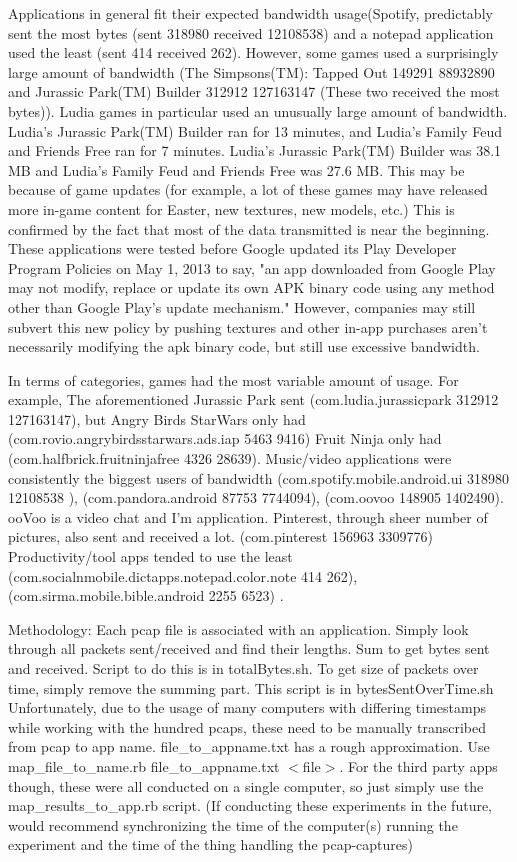 Applications in general fit their expected bandwidth usage(Spotify, predictably sent the most bytes (sent 318980 received 12108538) and a notepad application used the least (sent 414 received 262). However, some games used a surprisingly large amount of bandwidth (The Simpsons(TM): Tapped Out 149291 88932890 and Jurassic Park(TM) Builder
 312912 127163147 (These two received the most bytes)). Ludia games in particular used an unusually large amount of bandwidth. Ludia's Jurassic Park(TM) Builder ran for 13 minutes, and Ludia's Family Feud and Friends Free ran for 7 minutes. Ludia's Jurassic Park(TM) Builder was 38.1 MB  and Ludia's Family Feud and Friends Free was 27.6 MB. This may be because of game updates (for example, a lot of these games may have released more in-game content for Easter, new textures, new models, etc.) This is confirmed by the fact that most of the data transmitted is near the beginning. These applications were tested before Google updated its Play Developer Program Policies on May 1, 2013 to say, "an app downloaded from Google Play may not modify, replace or update its own APK binary code using any method other than Google Play's update mechanism." However, companies may still subvert this new policy by pushing textures and other in-app purchases aren't necessarily modifying the apk binary code, but still use excessive bandwidth. 
 
In terms of categories, games had the most variable amount of usage. For example, The aforementioned Jurassic Park sent  (com.ludia.jurassicpark 312912 127163147), but Angry Birds StarWars only had (com.rovio.angrybirdsstarwars.ads.iap 5463 9416)  Fruit Ninja only had (com.halfbrick.fruitninjafree 4326 28639). Music/video applications were consistently the biggest users of bandwidth (com.spotify.mobile.android.ui 318980 12108538
), (com.pandora.android 87753 7744094), (com.oovoo 148905 1402490). ooVoo is a video chat and I'm application.  Pinterest, through sheer number of pictures, also sent and received a lot. (com.pinterest 156963 3309776) Productivity/tool apps tended to use the least (com.socialnmobile.dictapps.notepad.color.note 414 262),(com.sirma.mobile.bible.android 2255 6523) .

Methodology: Each pcap file is associated with an application. Simply look through all packets sent/received and find their lengths. Sum to get bytes sent and received. Script to do this is in totalBytes.sh. 
To get size of packets over time, simply remove the summing part. This script is in bytesSentOverTime.sh
Unfortunately, due to the usage of many computers with differing timestamps while working with the hundred pcaps, these need to be manually transcribed from pcap to app name. file\_to\_appname.txt has a rough approximation. Use map\_file\_to\_name.rb file\_to\_appname.txt $<$file$>$.
For the third party apps though, these were all conducted on a single computer, so just simply use the map\_results\_to\_app.rb script. (If conducting these experiments in the future, would recommend synchronizing the time of the computer(s) running the experiment and the time of the thing handling the pcap-captures)

